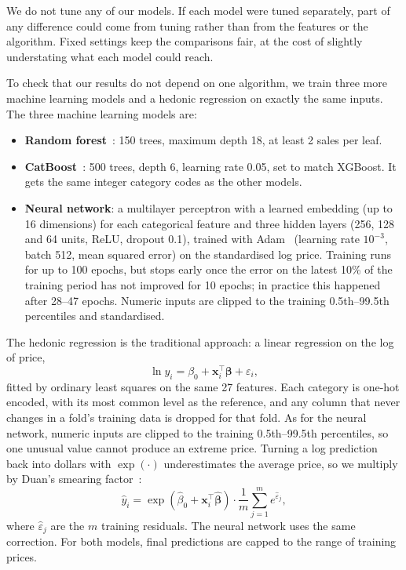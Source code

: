 \documentclass[conference]{IEEEtran}
\begin{document}
We do not tune any of our models. If each model were tuned separately,
part of any difference could come from tuning rather than from the
features or the algorithm. Fixed settings keep the comparisons fair, at
the cost of slightly understating what each model could reach.

To check that our results do not depend on one algorithm, we train three more machine learning models and a hedonic
regression on exactly the same inputs. The three machine learning models
are:
\begin{itemize}
  \item \textbf{Random forest}~\cite{breiman2001}: 150 trees, maximum
  depth 18, at least 2 sales per leaf.
  \item \textbf{CatBoost}~\cite{prokhorenkova2018}: 500 trees, depth 6,
  learning rate 0.05, set to match XGBoost. It gets the same integer
  category codes as the other models.
  \item \textbf{Neural network}: a multilayer perceptron with a learned
  embedding (up to 16 dimensions) for each categorical feature and three
  hidden layers (256, 128 and 64 units, ReLU, dropout 0.1), trained with
  Adam~\cite{kingma2015} (learning rate $10^{-3}$, batch 512, mean
  squared error) on the standardised log price. Training runs for up to
  100 epochs, but stops early once the error on the latest 10\% of the
  training period has not improved for 10 epochs; in practice this
  happened after 28--47 epochs. Numeric inputs are clipped to the training
  0.5th--99.5th percentiles and standardised.
\end{itemize}
The hedonic regression\label{sec:hedonic} is the traditional approach:
a linear regression on the log of price,
\begin{equation}
  \ln y_i = \beta_0 + \mathbf{x}_i^{\top}\boldsymbol{\beta}
            + \varepsilon_i,
  \label{eq:hedonic}
\end{equation}
fitted by ordinary least squares on the same 27 features. Each category
is one-hot encoded, with its most common level as the reference, and any
column that never changes in a fold's training data is dropped for that
fold. As for the neural network, numeric inputs are clipped to the
training 0.5th--99.5th percentiles, so one unusual value cannot produce
an extreme price. Turning a log prediction back into dollars with
$\exp(\cdot)$ underestimates the average price, so we multiply by
Duan's smearing factor~\cite{duan1983}:
\begin{equation}
  \hat{y}_i = \exp\!\left(\hat{\beta}_0 + \mathbf{x}_i^{\top}
  \hat{\boldsymbol{\beta}}\right)\cdot
  \frac{1}{m}\sum_{j=1}^{m}e^{\hat{\varepsilon}_j},
  \label{eq:smearing}
\end{equation}
where $\hat{\varepsilon}_j$ are the $m$ training residuals. The neural
network uses the same correction. For both models, final predictions
are capped to the range of training prices.
\end{document}
